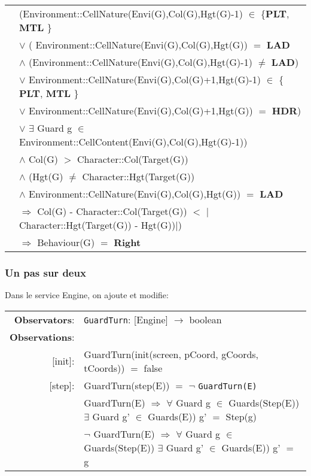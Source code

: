 \documentclass[8pt]{article}
\begin{document}
{\begin{longtable}{rl}
  & (\textrm{Environment::CellNature(Envi(G),Col(G),Hgt(G)-1)} $\in$ \{\textbf{PLT}, \textbf{MTL}  \} \\
  & \quad\quad\quad\quad $\lor$ ( \textrm{Environment::CellNature(Envi(G),Col(G),Hgt(G))} $=$ \textbf{LAD} \\
  & \quad\quad\quad\quad\quad\quad $\land$ (\textrm{Environment::CellNature(Envi(G),Col(G),Hgt(G)-1)} $\neq$ \textbf{LAD}) \\
  & \quad\quad\quad\quad\quad\quad\quad\quad $\lor$ \textrm{Environment::CellNature(Envi(G),Col(G)+1,Hgt(G)-1)} $\in$ \{ \textbf{PLT}, \textbf{MTL} \}\\
  & \quad\quad\quad\quad\quad\quad\quad\quad $\lor$ \textrm{Environment::CellNature(Envi(G),Col(G)+1,Hgt(G))} $=$ \textbf{HDR})\\
  & \quad\quad\quad\quad $\lor$ $\exists$ \textrm{Guard} g $\in$ \textrm{Environment::CellContent(Envi(G),Col(G),Hgt(G)-1)}) \\
  & \quad\quad $\land$ \textrm{Col(G)} $>$ \textrm{Character::Col(Target(G))} \\
  & \quad\quad $\land$ (\textrm{Hgt(G)} $\neq$ \textrm{Character::Hgt(Target(G))} \\
  & \quad\quad\quad\quad $\land$ \textrm{Environment::CellNature(Envi(G),Col(G),Hgt(G))} $=$ \textbf{LAD}\\
  & \quad\quad\quad\quad $\Rightarrow$ \textrm{Col(G) - Character::Col(Target(G))} $<$ $|$\textrm{Character::Hgt(Target(G)) - Hgt(G)})$|$) \\
  & \quad\quad $\Rightarrow$ \textrm{Behaviour(G)} $=$ \textbf{Right} \\
\end{longtable}}

\subsubsection{Un pas sur deux}
Dans le service Engine, on ajoute et modifie:
{\small
\begin{longtable}{rl}
  \textbf{Observators}:&\texttt{GuardTurn}: \textrm{[Engine]} $\rightarrow$ \textrm{boolean}\\
  \textbf{Observations}:&\\
  \textrm{[init]}:& \textrm{GuardTurn(init(screen, pCoord, gCoords, tCoords))} $=$ \textrm{false}\\
  \textrm{[step]}:& \textrm{GuardTurn(step(E))} $=$ $\neg$ \texttt{GuardTurn(E)}\\
  & \textrm{GuardTurn(E)} $\Rightarrow$ $\forall$ \textrm{Guard} g $\in$ \textrm{Guards(Step(E))} $\exists$ \textrm{Guard} g' $\in$ \textrm{Guards(E))} g' $=$ \textrm{Step(g)}\\
  & $\neg$ \textrm{GuardTurn(E)} $\Rightarrow$ $\forall$ \textrm{Guard} g $\in$ \textrm{Guards(Step(E))} $\exists$ \textrm{Guard} g' $\in$ \textrm{Guards(E))} g' $=$ \textrm{g}\\
\end{longtable}}
\end{document}
